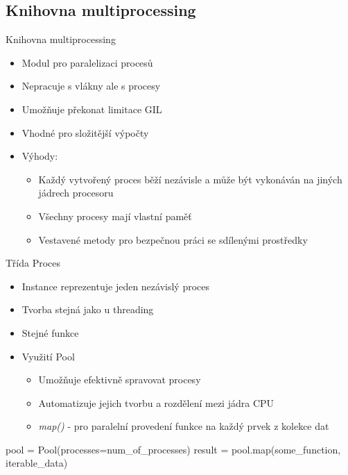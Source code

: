 \documentclass{beamer}
\begin{document}
\subsection{Knihovna multiprocessing}
\begin{frame}{Knihovna multiprocessing}
    \begin{itemize}
        \item Modul pro paralelizaci procesů
        \item Nepracuje s vlákny ale s procesy
        \item Umožňuje překonat limitace GIL
        \item Vhodné pro složitější výpočty
        
        \vskip 0.3in
        \item Výhody:
        \begin{itemize}
            \item Každý vytvořený proces běží nezávisle a může být vykonáván na jiných jádrech procesoru
            \item Všechny procesy mají vlastní paměť
            \item Vestavené metody pro bezpečnou práci se sdílenými prostředky
        \end{itemize}
    \end{itemize}
\end{frame}

\begin{frame}[fragile]{Třída Proces}
    \begin{itemize}
        \item Instance reprezentuje jeden nezávislý proces
        \item Tvorba stejná jako u threading
        \item Stejné funkce
        \vskip 0.25in

        \item Využití Pool
        \begin{itemize}
            \item Umožňuje efektivně spravovat procesy
            \item Automatizuje jejich tvorbu a rozdělení mezi jádra CPU
            \item \textit{map()} - pro paralelní provedení funkce na každý prvek z kolekce dat
        \end{itemize}
    \end{itemize}
    \scriptsize
    \begin{semiverbatim}
    pool = Pool(processes=num_of_processes) 
    result = pool.map(some_function, iterable_data)
    \end{semiverbatim}  
\end{frame}
\end{document}
